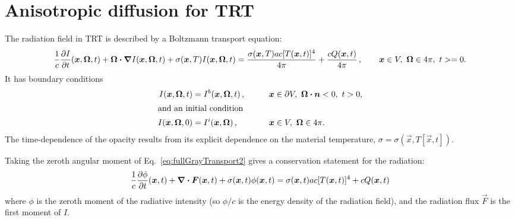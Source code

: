 
\newcommand{\epsiloncolor}[1]{#1}
\chapter{Anisotropic diffusion for TRT}
The radiation field in TRT is described by a Boltzmann transport equation:
\begin{equation}\label{eq:fullGrayTransport2}
  \frac{1}{c} \frac{\partial I}{\partial t}(\bm{x}, \bm{\Omega}, t)
  + \bm{\Omega} \bm{\cdot} \bm{\nabla} I(\bm{x}, \bm{\Omega}, t) +
 \sigma(\bm{x}, T) I(\bm{x}, \bm{\Omega}, t)
  = \frac{\sigma(\bm{x}, T) a c [T(\bm{x},t)]^4}{4\pi} 
  + \frac{c Q(\bm{x},t)}{4\pi} \,, \qquad \bm{x} \in V, \ \bm{\Omega} \in
  4\pi, \ t >= 0.
\end{equation}
It has boundary conditions
\begin{alignat*}{3}
  I(\bm{x}, \bm{\Omega}, t) &= I^b(\bm{x}, \bm{\Omega}, t) \,, &\qquad&
  \bm{x} \in \partial V, \  \bm{\Omega}\bm{\cdot} \bm{n} < 0, \ t > 0,
  \\
  \intertext{and an initial condition}
  I(\bm{x}, \bm{\Omega}, 0) &= I^i(\bm{x}, \bm{\Omega}) \,, &&
  \bm{x} \in V,\ \bm{\Omega} \in 4\pi.
\end{alignat*}
The time-dependence of the opacity results from its explicit dependence on
the material temperature, $\sigma = \sigma(\vec{x}, T[\vec{x},t])$.

Taking the zeroth angular moment of Eq.~\eqref{eq:fullGrayTransport2} gives a
conservation statement for the radiation:
\begin{equation} \label{eq:grayTransportZeroth}
  \frac{1}{c} \frac{\partial \phi}{\partial t}(\bm{x}, t)
  +\bm{\nabla} \bm{\cdot} \bm{F}(\bm{x}, t) +
 \sigma(\bm{x}, t) \phi(\bm{x}, t)
  = \sigma(\bm{x}, t) a c [T(\bm{x},t)]^4
  + c Q(\bm{x},t)
\end{equation}
where $\phi$ is the zeroth moment of the radiative intensity (so $\phi/c$ is
the energy density of the radiation field), and the radiation flux $\vec{F}$ is
the first moment of $I$.

